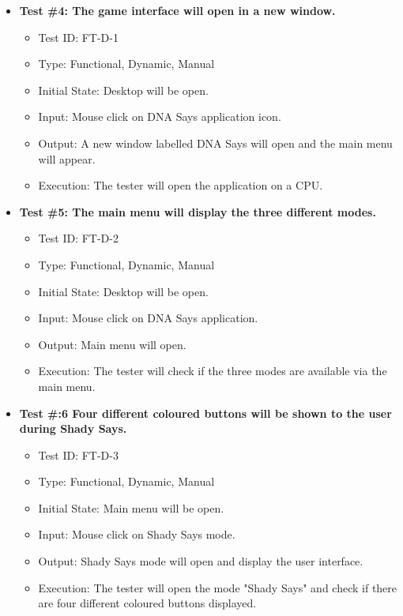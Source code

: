 \documentclass[12pt, titlepage]{article}
\begin{document}
\begin{itemize}

\item \textbf{Test \#4: The game interface will open in a new window.}
\begin{itemize}
\item Test ID: FT-D-1
\item Type: Functional, Dynamic, Manual 		
\item Initial State: Desktop will be open. 				
\item Input: Mouse click on DNA Says application icon. 					
\item Output: A new window labelled DNA Says will open and the main menu will appear.  					
\item Execution: The tester will open the application on a CPU.
\end{itemize}

\item \textbf{Test \#5: The main menu will display the three different modes.}
\begin{itemize}
\item Test ID: FT-D-2
\item Type: Functional, Dynamic, Manual	
\item Initial State: Desktop will be open.					
\item Input: Mouse click on DNA Says application.					
\item Output: Main menu will open. 					
\item Execution: The tester will check if the three modes are available via the main menu.
\end{itemize}

\item \textbf{Test \#:6 Four different coloured buttons will be shown to the user during Shady Says.}
\begin{itemize}
\item Test ID: FT-D-3
\item Type: Functional, Dynamic, Manual		
\item Initial State: Main menu will be open.					
\item Input: Mouse click on Shady Says mode.					
\item Output: Shady Says mode will open and display the user interface.					
\item Execution: The tester will open the mode "Shady Says" and check if there are four different coloured buttons displayed.
\end{itemize}


\end{itemize}
\end{document}
